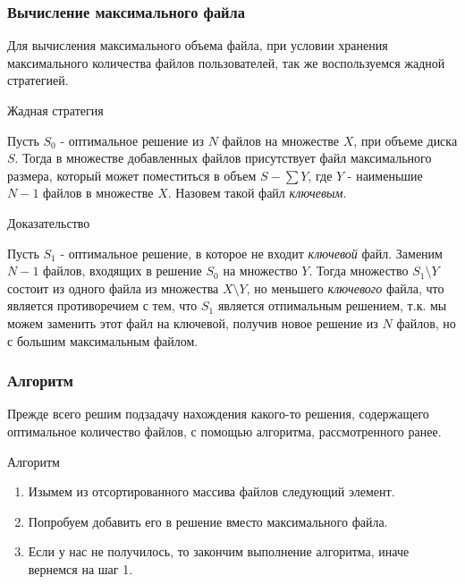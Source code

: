 \documentclass{beamer}
\begin{document}
\begin{frame}

    \frametitle{Вычисление максимального файла}

    { \footnotesize

    Для вычисления максимального объема файла, при условии хранения максимального количества файлов пользователей, так же воспользуемся \alert{жадной} стратегией.

    \pause

    \begin{alertblock}{Жадная стратегия}

        Пусть $S_0$ - оптимальное решение из $N$ файлов на множестве $X$, при объеме диска $S$. Тогда в множестве добавленных файлов присутствует файл максимального размера, который может поместиться в объем $S - \sum{Y}$, где $Y$ - наименьшие $N - 1$ файлов в множестве $X$. Назовем такой файл \emph{ключевым}.

    \end{alertblock}

    \pause

    \begin{block}{Доказательство}

        Пусть $S_1$ - оптимальное решение, в которое не входит \emph{ключевой} файл. Заменим $N - 1$ файлов, входящих в решение $S_0$ на множество $Y$. Тогда множество $S_1 \setminus Y$ состоит из одного файла из множества $X \setminus Y$, но меньшего \emph{ключевого} файла, что является противоречием с тем, что $S_1$ является отпимальным решением, т.к. мы можем заменить этот файл на ключевой, получив новое решение из $N$ файлов, но с большим максимальным файлом.

    \end{block}

    }

\end{frame}

\begin{frame}

    \frametitle{Алгоритм}

    Прежде всего решим подзадачу нахождения какого-то решения, содержащего оптимальное количество файлов, с помощью алгоритма, рассмотренного ранее.

    \pause

    \begin{alertblock}{Алгоритм}

        \begin{enumerate}

            \item Изымем из отсортированного массива файлов следующий элемент.

            \item Попробуем добавить его в решение вместо максимального файла.

            \item Если у нас не получилось, то закончим выполнение алгоритма, иначе вернемся на шаг 1.
        \end{enumerate}
        
    \end{alertblock}

\end{frame}
\end{document}
